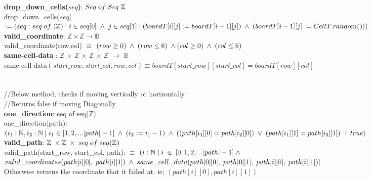 \documentclass[12pt]{article}
\begin{document}
\textbf{drop\_down\_cells($seq$)}: $Seq \thickspace of \thickspace Seq  \thickspace \mathbb{Z}$
\\drop\_down\_cells($seq$) $:= (seq : seq \thickspace of \thickspace (\mathbb{Z}) \thickspace | \thickspace i \in seq[0] \thickspace \land \thickspace j \in seq[1] : (boardT[i][j] := boardT[i-1][j]) \thickspace \land \thickspace (boardT[i-1][j] := CellT.random()))$\\

\textbf{valid\_coordinate}: $\mathbb{Z} \times \mathbb{Z} \rightarrow \mathbb{B}$ \\
valid\_coordinate(row,col) $\equiv$ $(row \ge 0) \thickspace \land \thickspace (row \le 6) \thickspace \land (col \ge 0) \thickspace \land \thickspace (col \le 6) $\\

\textbf{same-cell-data} : $\mathbb{Z}$ $\times$  $\mathbb{Z}$ $\times$ $\mathbb{Z}$ $\times$ $\mathbb{Z}$ $\rightarrow$ $\mathbb{B}$\\
same-cell-data$(start\_row, start\_col, row, col) \equiv boardT[start\_row][start\_col] = boardT[row][col]$\\\\\\

//Below method, checks if moving vertically or horizontally\\
//Returns false if moving Diagonally\\
\textbf{one\_direction}: seq of seq($\mathbb{Z}$)\\
one\_direction(path): $(i_1:\mathbb{N},i_2:\mathbb{N} \thickspace | \thickspace i_1 \in [1,2,...|path|-1] \thickspace \land \thickspace (i_2:=i_1-1) \thickspace \land \thickspace ((path[i_1][0] = path[i_2][0]) \thickspace \lor \thickspace (path[i_1][1] = path[i_2][1]) \thickspace : \thickspace true)$\\

\textbf{valid\_path}: $\mathbb{Z} \thickspace \times \mathbb{Z} \thickspace \times \thickspace seq \thickspace of \thickspace seq(\mathbb{Z})$ \\
valid\_path(start\_row, start\_col, path): $\equiv$ $(i : \mathbb{N} \thickspace | \thickspace i \thickspace \in \thickspace [0,1,2,...|path|-1] \thickspace \land \thickspace$\\ $valid\_coordinates(path[i][0],\thickspace path[i][1]) \thickspace \land \thickspace same\_cell\_data(path[0][0],\thickspace path[0][1],\thickspace path[i][0],\thickspace path[i][1]))$\\
Otherwise returns the coordinate that it failed at. ie; $(path[i][0],path[i][1])$\\
\end{document}
